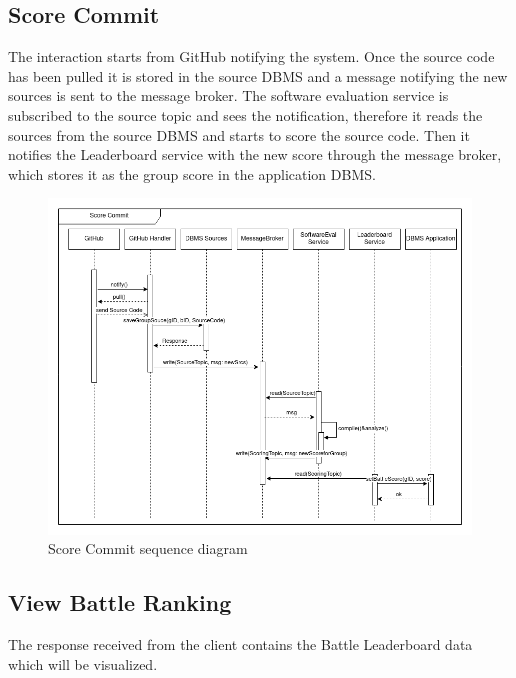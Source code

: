 \subsection{Score Commit}

The interaction starts from GitHub notifying the system. Once the source code has been pulled it is stored in the source DBMS and a message notifying the new sources is sent to the message broker.
The software evaluation service is subscribed to the source topic and sees the notification, therefore it reads the sources from the source DBMS and starts to score the source code. Then it notifies the Leaderboard service with the new score through the message broker, which stores it as the group score in the application DBMS.

\begin{figure}[H]
    \centering
    \includegraphics[width=1\linewidth]{misc//Images//UC/UC8.png}
    \caption{Score Commit sequence diagram}
    \label{fig:enter-label}
\end{figure}
\newpage
\subsection{View Battle Ranking}

The response received from the client contains the Battle Leaderboard data which will be visualized.

